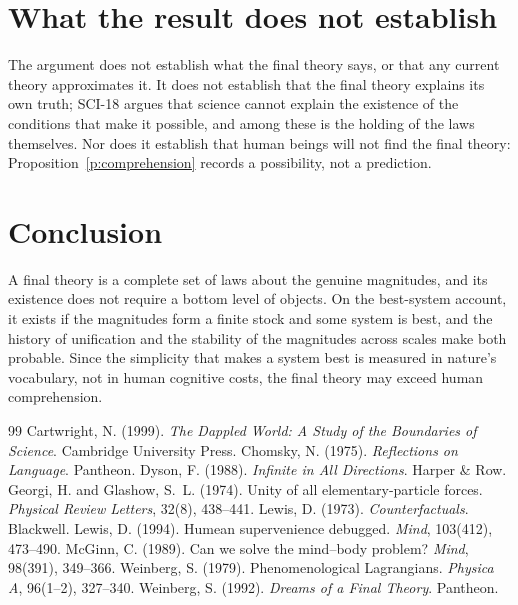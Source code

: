 \documentclass{situationist-preprint}
\begin{document}
\section{What the result does not establish}

The argument does not establish what the final theory says, or that any current theory approximates it. It does not establish that the final theory explains its own truth; SCI-18 argues that science cannot explain the existence of the conditions that make it possible, and among these is the holding of the laws themselves. Nor does it establish that human beings will not find the final theory: Proposition~\ref{p:comprehension} records a possibility, not a prediction.

\section{Conclusion}

A final theory is a complete set of laws about the genuine magnitudes, and its existence does not require a bottom level of objects. On the best-system account, it exists if the magnitudes form a finite stock and some system is best, and the history of unification and the stability of the magnitudes across scales make both probable. Since the simplicity that makes a system best is measured in nature's vocabulary, not in human cognitive costs, the final theory may exceed human comprehension.

\begin{thebibliography}{99}\small
{} Cartwright, N. (1999). \emph{The Dappled World: A Study of the Boundaries of Science}. Cambridge University Press.
 Chomsky, N. (1975). \emph{Reflections on Language}. Pantheon.
 Dyson, F. (1988). \emph{Infinite in All Directions}. Harper \& Row.
 Georgi, H. and Glashow, S.~L. (1974). Unity of all elementary-particle forces. \emph{Physical Review Letters}, 32(8), 438--441.
 Lewis, D. (1973). \emph{Counterfactuals}. Blackwell.
 Lewis, D. (1994). Humean supervenience debugged. \emph{Mind}, 103(412), 473--490.
 McGinn, C. (1989). Can we solve the mind--body problem? \emph{Mind}, 98(391), 349--366.
 Weinberg, S. (1979). Phenomenological Lagrangians. \emph{Physica A}, 96(1--2), 327--340.
 Weinberg, S. (1992). \emph{Dreams of a Final Theory}. Pantheon.
\end{thebibliography}
\end{document}
